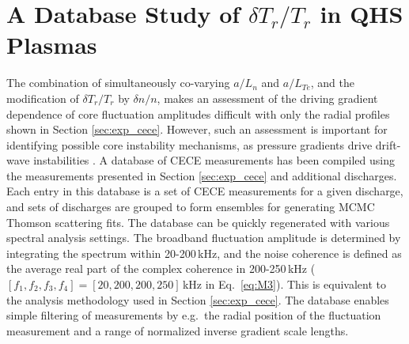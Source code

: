 \documentclass[%
 aip,
 amsmath,amssymb,
 reprint,%
]{revtex4-1}
\begin{document}

\section{A Database Study of $\delta T_r/T_r$ in QHS Plasmas} \label{sec:dT_database}

The combination of simultaneously co-varying $a/L_n$ and $a/L_{Te}$, and the modification of $\delta T_r/T_r$ by $\delta n/n$, makes an assessment of the driving gradient dependence of core fluctuation amplitudes difficult with only the radial profiles shown in Section \ref{sec:exp_cece}. However, such an assessment is important for identifying possible core instability mechanisms, as pressure gradients drive drift-wave instabilities \cite{horton1999drift}. A database of CECE measurements has been compiled using the measurements presented in Section \ref{sec:exp_cece} and additional discharges. Each entry in this database is a set of CECE measurements for a given discharge, and sets of discharges are grouped to form ensembles for generating MCMC Thomson scattering fits. The database can be quickly regenerated with various spectral analysis settings. The broadband fluctuation amplitude is determined by integrating the spectrum within 20-200\,kHz, and the noise coherence is defined as the average real part of the complex coherence in 200-250\,kHz ($[f_1,f_2,f_3,f_4] = [20,200,200,250]$\,kHz in Eq.\ \eqref{eq:M3}). This is equivalent to the analysis methodology used in Section \ref{sec:exp_cece}. The database enables simple filtering of measurements by e.g.\ the radial position of the fluctuation measurement and a range of normalized inverse gradient scale lengths.

\end{document}
